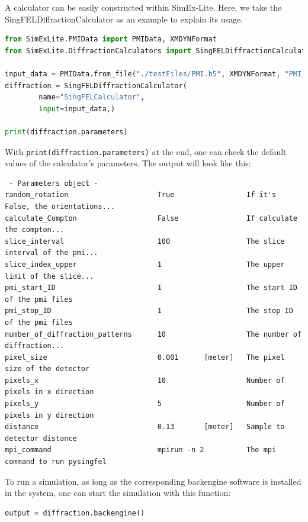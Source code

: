 \documentclass[11pt, a4paper]{article}
\begin{document}
A calculator can be easily constructed within SimEx-Lite. Here, we take the\\
SingFELDiffractionCalculator as an example to explain its usage.

\begin{lstlisting}[language=Python]
from SimExLite.PMIData import PMIData, XMDYNFormat
from SimExLite.DiffractionCalculators import SingFELDiffractionCalculator

input_data = PMIData.from_file("./testFiles/PMI.h5", XMDYNFormat, "PMI_data")
diffraction = SingFELDiffractionCalculator(
        name="SingFELCalculator",
        input=input_data,)

print(diffraction.parameters)
\end{lstlisting}

With \verb|print(diffraction.parameters)| at the end, one can check the default values of the calculator's parameters. The output will look like this:

\begin{lstlisting}
 - Parameters object -
random_rotation                     True                 If it's False, the orientations...
calculate_Compton                   False                If calculate the compton...   
slice_interval                      100                  The slice interval of the pmi...  
slice_index_upper                   1                    The upper limit of the slice...
pmi_start_ID                        1                    The start ID of the pmi files   
pmi_stop_ID                         1                    The stop ID of the pmi files   
number_of_diffraction_patterns      10                   The number of diffraction...
pixel_size                          0.001      [meter]   The pixel size of the detector   
pixels_x                            10                   Number of pixels in x direction   
pixels_y                            5                    Number of pixels in y direction   
distance                            0.13       [meter]   Sample to detector distance   
mpi_command                         mpirun -n 2          The mpi command to run pysingfel
\end{lstlisting}

To run a simulation, as long as the corresponding backengine software is installed in the system, one can start the simulation with this function:
\begin{lstlisting}
output = diffraction.backengine()
\end{lstlisting}
\end{document}
